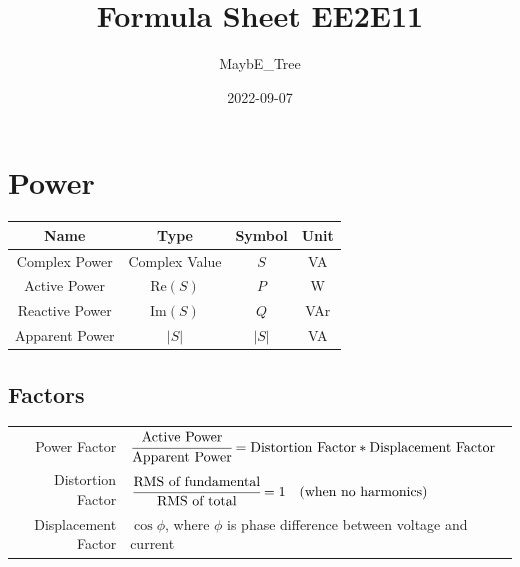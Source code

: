 \documentclass[12pt]{article}
\title{Formula Sheet EE2E11}
\author{MaybE\_Tree}
\date{2022-09-07}
\begin{document}
\maketitle


\section{Power}
\begin{center}
		\begin{tabular}{|cccc|}
			\hline
			\bf Name & \bf Type & \bf Symbol & \bf Unit \\\hline
			Complex Power & Complex Value & $S$ & VA \\
			Active Power & $ \text{Re}(S) $  & $P$ & W \\
			Reactive Power & $ \text{Im}(S) $  & $Q$ & VAr \\
			Apparent Power & $ |S| $  & $ |S| $  & VA \\
			\hline
		\end{tabular}
\end{center}

\subsection{Factors}
\begin{center}
	\begin{tabular}{rl}
		Power Factor &
		$ \cfrac{\text{Active Power}}{\text{Apparent Power}} = \text{Distortion Factor} * \text{Displacement Factor}$ \\
		Distortion Factor &
		$ \cfrac{\text{RMS of fundamental}}{\text{RMS of total}} = 1 \quad \text{(when no harmonics)} $ \\
		Displacement Factor &
		$ \cos \phi $, where $\phi$ is phase difference between voltage and current \\
	\end{tabular}
\end{center}
		
\end{document}
